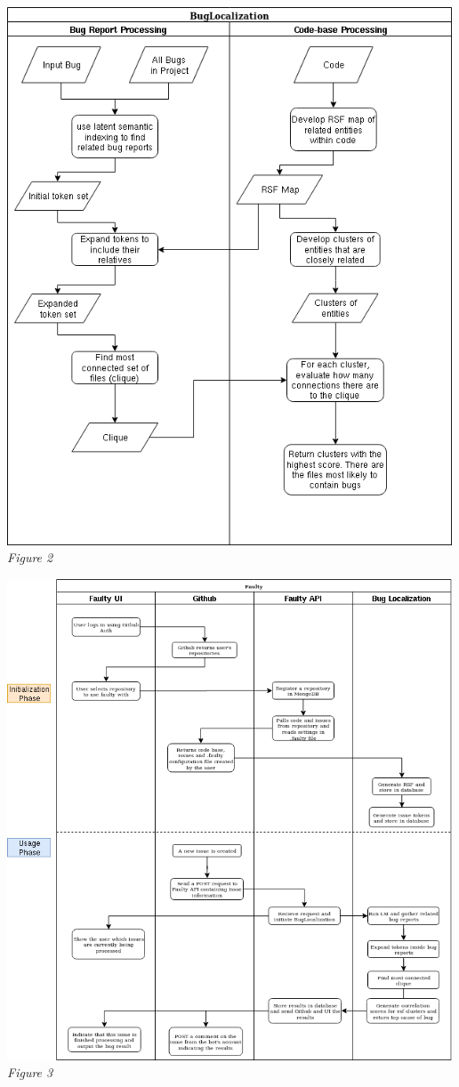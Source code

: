 \documentclass[12pt]{article}
\begin{document}
\includegraphics[width=500px]{../images/BugLocalizationFlow}
\emph{Figure 2}

\includegraphics[width=500px]{../images/Flow} \emph{Figure 3}
\end{document}

